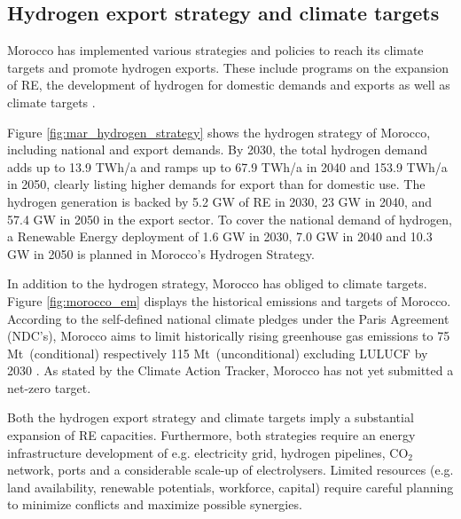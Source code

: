 \subsection*{Hydrogen export strategy and climate targets}

Morocco has implemented various strategies and policies to reach its climate targets and promote hydrogen exports. These include programs on the expansion of RE, the development of hydrogen for domestic demands and exports as well as climate targets \cite{MarHyStrat2021, CAT2021}.

Figure \ref{fig:mar_hydrogen_strategy} shows the hydrogen strategy of Morocco, including national and export demands.
By 2030, the total hydrogen demand adds up to 13.9 TWh/a and ramps up to 67.9 TWh/a in 2040 and 153.9 TWh/a in 2050, 
clearly listing higher demands for export than for domestic use. The hydrogen generation is backed by 5.2 GW of RE in 2030, 23 GW in 2040, and 57.4 GW in 2050 in the export sector. To cover the national demand of hydrogen, a Renewable Energy deployment of 1.6 GW in 2030, 7.0 GW in 2040 and 10.3 GW in 2050 is planned in Morocco's Hydrogen Strategy\cite{MarHyStrat2021}.


In addition to the hydrogen strategy, Morocco has obliged to climate targets. Figure \ref{fig:morocco_em} displays the historical emissions and targets of Morocco.
According to the self-defined national climate pledges under the Paris Agreement (NDC's), Morocco aims to limit historically rising greenhouse gas emissions to 75 Mt\coe\ (conditional) respectively 115 Mt\coe\ (unconditional) excluding LULUCF by 2030 \cite{CAT2021}. 
As stated by the Climate Action Tracker\cite{CAT2021}, Morocco has not yet submitted a net-zero target. 


Both the hydrogen export strategy and climate targets imply a substantial expansion of RE capacities. Furthermore, both strategies require an energy infrastructure development of e.g. electricity grid, hydrogen pipelines, $\mathrm{CO_2}$ network, ports and a considerable scale-up of electrolysers.
Limited resources (e.g. land availability, renewable potentials, workforce, capital) require careful planning to minimize conflicts and maximize possible synergies.

